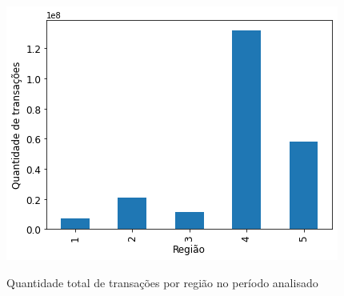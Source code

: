 \begin{figure}[htb]
	\centering
    \caption{Quantidade total de transações por região no período analisado}
    \includegraphics[scale=0.7]{images/base-de-dados-11.2-transacoes-total-por-regiao.png}
    \label{fig:pandemia:descritiva-11.2-transacoes-total-por-regiao}
    \fautor
\end{figure}

